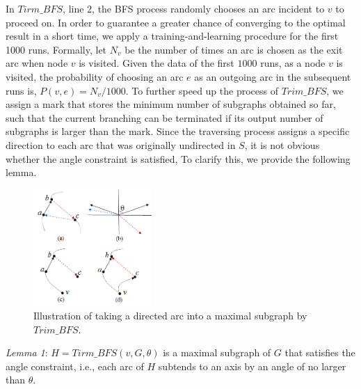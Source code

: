 In $Tirm\_BFS$, line $2$, the BFS process randomly chooses an arc incident to $v$ to proceed on. In order to guarantee a greater chance of converging to the optimal result in a short time, we apply a training-and-learning procedure for the first 1000 runs. Formally, let $N_v$ be the number of times an arc is chosen as the exit arc when node $v$ is visited. Given the data of the first $1000$ runs, as a node $v$ is visited, the probability of choosing an arc $e$ as an outgoing arc in the subsequent runs is, $P(v, e) = N_v/1000$. To further speed up the process of $Trim\_BFS$, we assign a mark that stores the minimum number of subgraphs obtained so far, such that the current branching can be terminated if its output number of subgraphs is larger than the mark. Since the traversing process assigns a specific direction to each arc that was originally undirected in $S$, it is not obvious whether the angle constraint is satisfied, To clarify this, we provide the following lemma.


\begin{figure}[t]
  \centering
  \mbox{} \hfill
  \includegraphics[width=0.4\textwidth]{figs/proof.png}
  \caption{\label{fig:proof}%
           Illustration of taking a directed arc into a maximal subgraph by $Trim\_BFS$.}
\end{figure}



\emph{Lemma 1}: $H = Tirm\_BFS(v, G, \theta)$ is a maximal subgraph of $G$ that satisfies the angle constraint, i.e., each arc of $H$ subtends to an axis by an angle of no larger than $\theta$.


